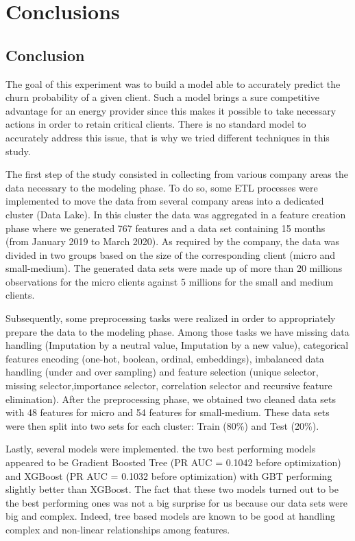\documentclass[LaM,binding=0.6cm, english]{sapthesis}
\begin{document}
\chapter{Conclusions}

\section{Conclusion}

The goal of this experiment was to build a model able to accurately predict the churn probability of a given client. Such a model brings a sure competitive advantage for an energy provider since this makes it possible to take necessary actions in order to retain critical clients. There is no standard model to accurately address this issue, that is why we tried different techniques in this study.

The first step of the study consisted in collecting from various company areas the data necessary to the modeling phase. To do so, some ETL processes were implemented to move the data from several company areas into a dedicated cluster (Data Lake). In this cluster the data was aggregated in a feature creation phase where we generated 767 features and a data set containing 15 months (from January 2019 to March 2020). As required by the company, the data was divided in two groups based on the size of the corresponding client (micro and small-medium). The generated data sets were made up of more than 20 millions observations for the micro clients against 5 millions for the small and medium clients.

Subsequently, some preprocessing tasks were realized in order to appropriately prepare the data to the modeling phase. Among those tasks we have missing data handling (Imputation by a neutral value, Imputation by a new value), categorical features encoding (one-hot, boolean, ordinal, embeddings), imbalanced data handling (under and over sampling) and feature selection (unique selector, missing selector,importance selector, correlation selector and recursive feature elimination). After the preprocessing phase, we obtained two cleaned data sets with 48 features for micro and 54 features for small-medium. These data sets were then split into two sets for each cluster: Train (80\%) and Test (20\%).

Lastly, several models were implemented. the two best performing models appeared to be Gradient Boosted Tree (PR AUC = 0.1042 before optimization) and XGBoost (PR AUC = 0.1032 before optimization) with GBT performing slightly better than XGBoost. The fact that these two models turned out to be the best performing ones was not a big surprise for us because our data sets were big and complex. Indeed, tree based models are known to be good at handling complex and non-linear relationships among features.
\end{document}
